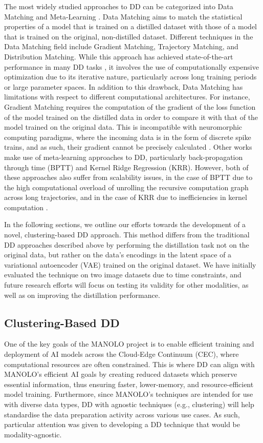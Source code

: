 The most widely studied approaches to DD can be categorized into Data Matching and Meta-Learning \cite{dd_survey}. Data Matching aims to match the statistical properties of a model that is trained on a distilled dataset with those of a model that is trained on the original, non-distilled dataset. Different techniques in the Data Matching field include Gradient Matching, Trajectory Matching, and Distribution Matching. While this approach has achieved state-of-the-art performance in many DD tasks \cite{datadam}, it involves the use of computationally expensive optimization due to its iterative nature, particularly across long training periods or large parameter spaces. In addition to this drawback, Data Matching has limitations with respect to different computational architectures. For instance, Gradient Matching requires the computation of the gradient of the loss function of the model trained on the distilled data in order to compare it with that of the model trained on the original data. This is incompatible with neuromorphic computing paradigms, where the incoming data is in the form of discrete spike trains, and as such, their gradient cannot be precisely calculated \cite{bengio2013estimating}. Other works make use of meta-learning approaches to DD, particularly back-propagation through time (BPTT) and Kernel Ridge Regression (KRR). However, both of these approaches also suffer from scalability issues, in the case of BPTT due to the high computational overload of unrolling the recursive computation graph across long trajectories, and in the case of KRR due to inefficiencies in kernel computation \cite{dd_survey}.

In the following sections, we outline our efforts towards the development of a novel, clustering-based DD approach. This method differs from the traditional DD approaches described above by performing the distillation task not on the original data, but rather on the data's encodings in the latent space of a variational autoencoder (VAE) trained on the original dataset. We have initially evaluated the technique on two image datasets due to time constraints, and future research efforts will focus on testing its validity for other modalities, as well as on improving the distillation performance.

\subsection{Clustering-Based DD}\label{subsec:2.3_datdist_tech1}

One of the key goals of the MANOLO project is to enable efficient training and deployment of AI models across the Cloud-Edge Continuum (CEC), where computational resources are often constrained. This is where DD can align with MANOLO’s efficient AI goals by creating reduced datasets which preserve essential information, thus ensuring faster, lower-memory, and resource-efficient model training. Furthermore, since MANOLO’s techniques are intended for use with diverse data types, DD with agnostic techniques (e.g., clustering) will help standardise the data preparation activity across various use cases. As such, particular attention was given to developing a DD technique that would be modality-agnostic.

